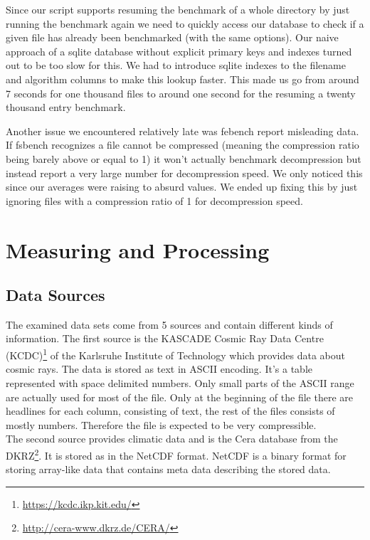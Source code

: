 \documentclass[
	12pt,
	a4paper,
	BCOR10mm,
	DIV14,
	listof=totoc,
	bibliography=totoc,
	headsepline
]{scrreprt}
\begin{document}
Since our script supports resuming the benchmark of a whole directory by just running the benchmark again we need to quickly access our database to check if a given file has already been benchmarked (with the same options). Our naive approach of a sqlite database without explicit primary keys and indexes turned out to be too slow for this.
We had to introduce sqlite indexes to the filename and algorithm columns to make this lookup faster. This made us go from around 7 seconds for one thousand files to around one second for the resuming a twenty thousand entry benchmark. 

Another issue we encountered relatively late was febench report misleading data. If fsbench recognizes a file cannot be compressed (meaning the compression ratio being barely above or equal to 1) it won't actually benchmark decompression but instead report a very large number for decompression speed. We only noticed this since our averages were raising to absurd values.
We ended up fixing this by just ignoring files with a compression ratio of 1 for decompression speed.

\chapter{Measuring and Processing}
\label{Measuring and Processing}
\section{Data Sources}
The examined data sets come from 5 sources and contain different kinds of information.
The first source is the KASCADE Cosmic Ray Data Centre (KCDC)\footnote{\url{https://kcdc.ikp.kit.edu/}} of the Karlsruhe Institute of Technology which provides data about cosmic rays. 
The data is stored as text in ASCII encoding. 
It's a table represented with space delimited numbers. Only small parts of the ASCII range are actually used for most of the file. Only at the beginning of the file there are headlines for each column, consisting of text, the rest of the files consists of mostly numbers.
Therefore the file is expected to be very compressible.
\\

The second source provides climatic data and is the Cera database from the DKRZ\footnote{\url{http://cera-www.dkrz.de/CERA/}}. 
It is stored as in the NetCDF format.
NetCDF is a binary format for storing array-like data that contains meta data describing the stored data.
\cite{NetCDF}
\\
\end{document}
